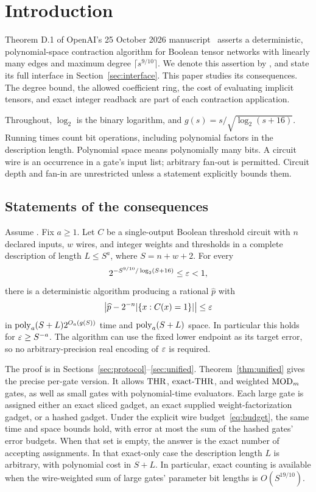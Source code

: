 \section{Introduction}

Theorem D.1 of OpenAI's 25 October 2026 manuscript~\cite{OpenAI26}
asserts a deterministic, polynomial-space contraction algorithm for
Boolean tensor networks with linearly many edges and maximum degree
$\lceil s^{9/10}\rceil$. We denote this assertion by \HTC, and state its
full interface in Section~\ref{sec:interface}. This paper studies its
consequences. The degree bound, the allowed coefficient ring, the cost
of evaluating implicit tensors, and exact integer readback are part of
each contraction application.

Throughout, $\log_2$ is the binary logarithm, and
$g(s)=s/\sqrt{\log_2(s+16)}$. Running times count bit operations, including
polynomial factors in the description length. Polynomial space means
polynomially many bits. A circuit wire is an occurrence in a gate's
input list; arbitrary fan-out is permitted. Circuit depth and fan-in
are unrestricted unless a statement explicitly bounds them.

\subsection{Statements of the consequences}

\begin{theorem}
\label{thm:capp}
Assume \HTC. Fix $a\ge1$. Let $C$ be a single-output Boolean threshold
circuit with $n$ declared inputs, $w$ wires, and integer weights and
thresholds in a complete description of length $L\le S^a$, where
$S=n+w+2$. For every
\[
 2^{-S^{9/10}/\log_2(S+16)}\le\varepsilon<1,
\]
there is a deterministic algorithm producing a rational $\widehat p$
with
\[
 \left|\widehat p-2^{-n}|\{x:C(x)=1\}|\right|\le\varepsilon
\]
in $\operatorname{poly}_a(S+L)2^{O_a(g(S))}$ time and $\operatorname{poly}_a(S+L)$ space.
In particular this holds for $\varepsilon\ge S^{-a}$. The algorithm can use the
fixed lower endpoint as its target error, so no arbitrary-precision real
encoding of $\varepsilon$ is required.
\end{theorem}

The proof is in Sections~\ref{sec:protocol}--\ref{sec:unified}.
Theorem~\ref{thm:unified} gives the precise per-gate version. It allows
$\mathrm{THR}$, $\mathrm{exact\text{-}THR}$, and weighted $\mathrm{MOD}_m$ gates, as well as small gates
with polynomial-time evaluators. Each large gate is assigned either an
exact sliced gadget, an exact supplied weight-factorization gadget, or
a hashed gadget. Under the explicit wire budget~\eqref{eq:budget},
the same time and space bounds hold, with error at most the sum of the
hashed gates' error budgets. When that set is empty, the answer is the
exact number of accepting assignments. In that exact-only case
the description length $L$ is arbitrary, with polynomial cost in $S+L$.
In particular, exact counting is available when the wire-weighted sum
of large gates' parameter bit lengths is $O(S^{19/10})$.


